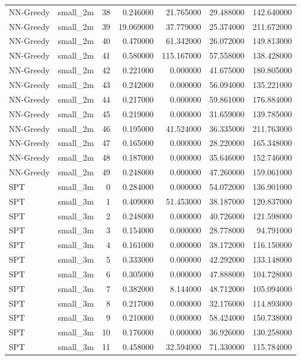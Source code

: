 \begin{tabular}{llrrrrr}
NN-Greedy & small_2m & 38 & 0.246000 & 21.765000 & 29.488000 & 142.640000 \\
NN-Greedy & small_2m & 39 & 19.069000 & 37.779000 & 25.374000 & 211.672000 \\
NN-Greedy & small_2m & 40 & 0.470000 & 61.342000 & 26.072000 & 149.813000 \\
NN-Greedy & small_2m & 41 & 0.580000 & 115.167000 & 57.558000 & 138.428000 \\
NN-Greedy & small_2m & 42 & 0.221000 & 0.000000 & 41.675000 & 180.805000 \\
NN-Greedy & small_2m & 43 & 0.242000 & 0.000000 & 56.094000 & 135.221000 \\
NN-Greedy & small_2m & 44 & 0.217000 & 0.000000 & 59.861000 & 176.884000 \\
NN-Greedy & small_2m & 45 & 0.219000 & 0.000000 & 31.659000 & 139.785000 \\
NN-Greedy & small_2m & 46 & 0.195000 & 41.524000 & 36.335000 & 211.763000 \\
NN-Greedy & small_2m & 47 & 0.165000 & 0.000000 & 28.220000 & 165.348000 \\
NN-Greedy & small_2m & 48 & 0.187000 & 0.000000 & 35.646000 & 152.746000 \\
NN-Greedy & small_2m & 49 & 0.248000 & 0.000000 & 47.260000 & 159.061000 \\
SPT & small_3m & 0 & 0.284000 & 0.000000 & 54.072000 & 136.901000 \\
SPT & small_3m & 1 & 0.409000 & 51.453000 & 38.187000 & 120.837000 \\
SPT & small_3m & 2 & 0.248000 & 0.000000 & 40.726000 & 121.598000 \\
SPT & small_3m & 3 & 0.154000 & 0.000000 & 28.778000 & 94.791000 \\
SPT & small_3m & 4 & 0.161000 & 0.000000 & 38.172000 & 116.150000 \\
SPT & small_3m & 5 & 0.333000 & 0.000000 & 42.292000 & 133.148000 \\
SPT & small_3m & 6 & 0.305000 & 0.000000 & 47.888000 & 104.728000 \\
SPT & small_3m & 7 & 0.382000 & 8.144000 & 48.712000 & 105.094000 \\
SPT & small_3m & 8 & 0.217000 & 0.000000 & 32.176000 & 114.893000 \\
SPT & small_3m & 9 & 0.210000 & 0.000000 & 58.424000 & 150.738000 \\
SPT & small_3m & 10 & 0.176000 & 0.000000 & 36.926000 & 130.258000 \\
SPT & small_3m & 11 & 0.458000 & 32.594000 & 71.330000 & 115.784000 \\

\end{tabular}
